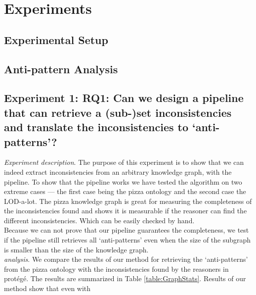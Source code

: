\documentclass{article}
\begin{document}
\newpage
\section{Experiments}
\subsection{Experimental Setup}



\subsection{Anti-pattern Analysis}

\subsection{Experiment 1: \textbf{RQ1}:  Can we design a pipeline that can retrieve a (sub-)set inconsistencies and translate the inconsistencies to `anti-patterns'?}
\textit{Experiment description}. The purpose of this experiment is to show that we can indeed extract inconsistencies from an arbitrary knowledge graph, with the pipeline. 
To show that the pipeline works we have tested the algorithm on two extreme cases — the first case being the pizza ontology and the second case the LOD-a-lot.
The pizza knowledge graph is great for measuring the completeness of the inconsistencies found and shows it is measurable if the reasoner can find the different inconsistencies. Which can be easily checked by hand.\\
Because we can not prove that our pipeline guarantees the completeness, we test if the pipeline still retrieves all `anti-patterns' even when the size of the subgraph is 
smaller than the size of the knowledge graph.\\
\textit{analysis}. We compare the results of our method for retrieving the `anti-patterns' from the pizza ontology with the inconsistencies found by the reasoners in prot\'{e}g\'{e}.
The results are summarized in Table \ref{table:GraphStats}. Results of our method show that even with 
\end{document}

